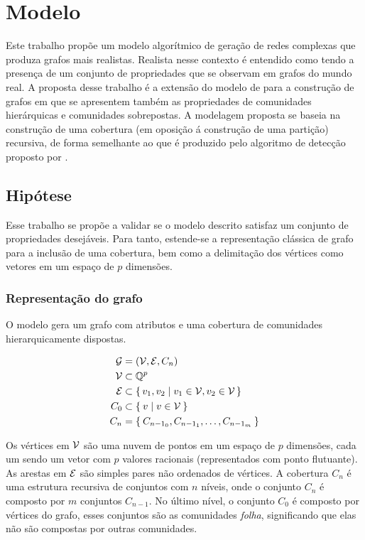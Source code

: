 \documentclass[notes.tex]{subfiles}
\begin{document}
\chapter{Modelo}

Este trabalho propõe um modelo algorítmico de geração de redes complexas que produza grafos mais realistas.
Realista nesse contexto é entendido como tendo a presença de um conjunto de propriedades que se observam em grafos do mundo real.
A proposta desse trabalho é a extensão do modelo de  para a construção de grafos em que se apresentem também as propriedades de comunidades hierárquicas e comunidades sobrepostas.
A modelagem proposta se baseia na construção de uma cobertura (em oposição á construção de uma partição) recursiva, de forma semelhante ao que é produzido pelo algoritmo de detecção proposto por .


\section{Hipótese}

Esse trabalho se propõe a validar se o modelo descrito satisfaz um conjunto de propriedades desejáveis.
Para tanto, estende-se a representação clássica de grafo para a inclusão de uma cobertura, bem como a delimitação dos vértices como vetores em um espaço de $p$ dimensões.

\subsection{Representação do grafo}

O modelo gera um grafo com atributos e uma cobertura de comunidades hierarquicamente dispostas.

\begin{equation}
\begin{split}
    \operatorname{\mathcal{G}} &= (\operatorname{\mathcal{V}}, \operatorname{\mathcal{E}}, C_n) \\
    \operatorname{\mathcal{V}} &\subset  \mathbb{Q}^{p} \\
    \operatorname{\mathcal{E}} &\subset \set{v_1, v_2 | v_1 \in \operatorname{\mathcal{V}}, v_2 \in \operatorname{\mathcal{V}}} \\
     C_0 &\subset \Set{v | v \in \operatorname{\mathcal{V}}} \\
     C_n &= \Set{C_{n-1_0}, C_{n-1_1}, \ldots, C_{n-1_m}} \\
\end{split}
\end{equation}

Os vértices em $\operatorname{\mathcal{V}}$ são uma nuvem de pontos em um espaço de $p$ dimensões, cada um sendo um vetor com $p$ valores racionais (representados com ponto flutuante).
As arestas em $\operatorname{\mathcal{E}}$ são simples pares não ordenados de vértices.
A cobertura $C_n$ é uma estrutura recursiva de conjuntos com $n$ níveis, onde o conjunto $C_n$ é composto por $m$ conjuntos $C_{n-1}$.
No último nível, o conjunto $C_0$ é composto por vértices do grafo, esses conjuntos são as comunidades \emph{folha}, significando que elas não são compostas por outras comunidades.
\end{document}
